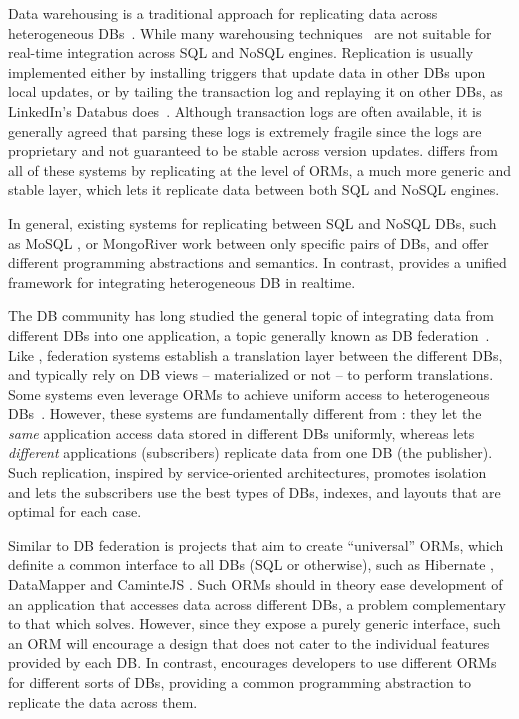 Data warehousing is a traditional approach for replicating data across
heterogeneous DBs~\cite{books/daglib/0029346,Chaudhuri:1997:ODW:248603.248616}.
While many warehousing techniques~\cite{Chan:1999:DSM:319757.319787,10.1109/TKDE.2005.16,Yang:1997:AMV:645923.673657,dynamo-es-river,mongo-es-river,mosql} are not suitable for
real-time integration across SQL and NoSQL engines.
Replication is usually implemented either by installing
triggers that update data in other DBs upon local updates, or by tailing the
transaction log and replaying it on other DBs, as LinkedIn's Databus
does~\cite{databus}.
Although transaction logs are often available, it is
generally agreed that parsing these logs is extremely fragile
since the logs are proprietary and not guaranteed to be stable across version
updates.  \synapse differs from all of these systems by
replicating at the level of ORMs, a much more generic and stable layer, which
lets it replicate data between both SQL and NoSQL engines.

In general, existing systems for replicating between SQL and NoSQL DBs, such as
MoSQL \cite{mosql}, or MongoRiver \cite{mongo-es-river} work between only
specific pairs of DBs, and offer different programming abstractions and
semantics. In contrast, \synapse provides a unified framework for
integrating heterogeneous DB in realtime.


The DB community has long studied the general topic of integrating data from
different DBs into one application, a topic generally known as DB
federation~\cite{ramakrishnan2003database}. Like \synapse, federation systems
establish a translation layer between the different DBs, and typically rely on
DB views -- materialized or not -- to perform translations.  Some systems even
leverage ORMs to achieve uniform access to heterogeneous
DBs~\cite{conf/otm/BalstersH09}. However, these systems are fundamentally
different from \synapse: they let the {\em same} application access data
stored in different DBs uniformly, whereas \synapse lets {\em different}
applications (subscribers) replicate data from one DB (the publisher).  Such
replication, inspired by service-oriented architectures, promotes isolation
and lets the subscribers use the best types of DBs, indexes, and layouts that
are optimal for each case.

Similar to DB federation is projects that aim to create ``universal'' ORMs, which definite a common interface to all DBs (SQL or otherwise), such as Hibernate \cite{hibernate}, DataMapper \cite{datamapper} and CaminteJS \cite{camintejs}.
Such ORMs should in theory ease development of an application that accesses data across different DBs, a problem complementary to that which \synapse solves.
However, since they expose a purely generic interface, such an ORM will encourage a design that does not cater to the individual features provided by each DB.
In contrast, \synapse encourages developers to use different ORMs for different sorts of DBs, providing a common programming abstraction to replicate the data across them.

